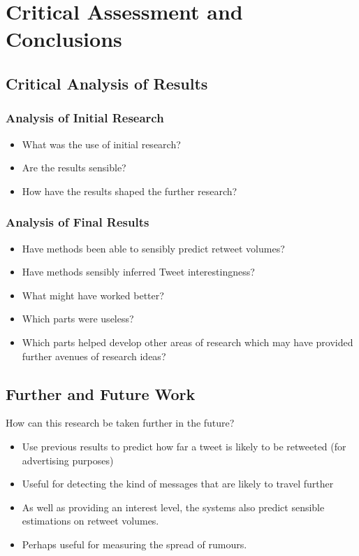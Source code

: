\chapter{Critical Assessment and Conclusions}


\section{Critical Analysis of Results}
\subsection{Analysis of Initial Research}
\begin{itemize}
\item What was the use of initial research?
\item Are the results sensible?
\item How have the results shaped the further research?
\end{itemize}

\subsection{Analysis of Final Results}
\begin{itemize}
\item Have methods been able to sensibly predict retweet volumes?
\item Have methods sensibly inferred Tweet interestingness?
\item What might have worked better?
\item Which parts were useless?
\item Which parts helped develop other areas of research which may have provided further avenues of research ideas?
\end{itemize}


\section{Further and Future Work}
How can this research be taken further in the future?

\begin{itemize}
\item Use previous results to predict how far a tweet is likely to be retweeted (for advertising purposes)
\item Useful for detecting the kind of messages that are likely to travel further
\item As well as providing an interest level, the systems also predict sensible estimations on retweet volumes.
\item Perhaps useful for measuring the spread of rumours.
\end{itemize}


